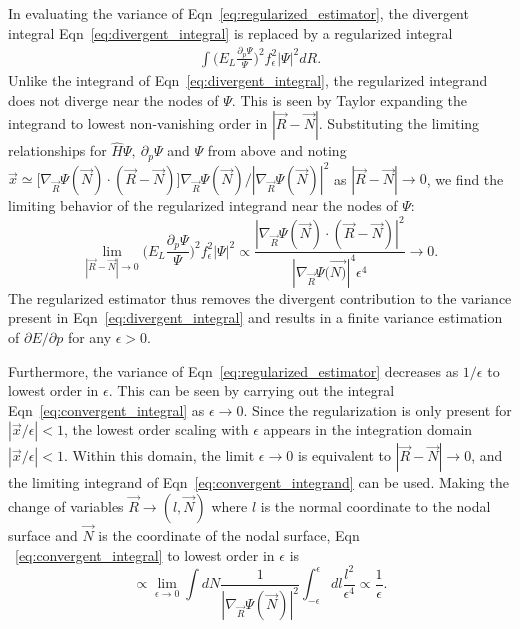 \documentclass[twocolumn]{revtex4-1}
\begin{document}
In evaluating the variance of Eqn~\ref{eq:regularized_estimator}, the divergent integral Eqn~\ref{eq:divergent_integral} is replaced by a regularized integral
\begin{equation}
\begin{split}
\int \Big(E_L\frac{\partial_p\Psi}{\Psi}\Big)^2 f_\epsilon^2 |\Psi|^2 dR.
\end{split}
\label{eq:convergent_integral}
\end{equation}
Unlike the integrand of Eqn~\ref{eq:divergent_integral}, the regularized integrand does not diverge near the nodes of $\Psi$. 
This is seen by Taylor expanding the integrand to lowest non-vanishing order in $|\vec{R} - \vec{N}|$. 
Substituting the limiting relationships for $\hat{H}\Psi, \ \partial_p \Psi$ and $\Psi$ from above and noting $\vec{x} \simeq \Big[\nabla_{\vec{R}}\Psi(\vec{N}) \cdot (\vec{R} - \vec{N}) \Big]\nabla_{\vec{R}} \Psi(\vec{N}) / |\nabla_{\vec{R}} \Psi(\vec{N})|^2$ as $|\vec{R} - \vec{N}| \rightarrow 0$, we find the limiting behavior of the regularized integrand near the nodes of $\Psi$: 
\begin{equation}
\lim_{|\vec{R} - \vec{N}| \rightarrow 0 } \Big(E_L\frac{\partial_p\Psi}{\Psi}\Big)^2 f_\epsilon^2 |\Psi|^2 \propto \frac{|\nabla_{\vec{R}}\Psi(\vec{N}) \cdot (\vec{R} - \vec{N})|^2}{|\nabla_{\vec{R}}\Psi(\vec{N)}|^4 \epsilon^4}\rightarrow 0.
\label{eq:convergent_integrand}
\end{equation}
The regularized estimator thus removes the divergent contribution to the variance present in Eqn~\ref{eq:divergent_integral} and results in a finite variance estimation of $\partial E/\partial p$ for any $\epsilon > 0$.

Furthermore, the variance of Eqn~\ref{eq:regularized_estimator} decreases as $1/\epsilon$ to lowest order in $\epsilon$.
This can be seen by carrying out the integral Eqn~\ref{eq:convergent_integral} as $\epsilon\rightarrow 0 $. 
Since the regularization is only present for $|\vec{x}/\epsilon| < 1$, the lowest order scaling with $\epsilon$ appears in the integration domain $|\vec{x}/\epsilon| < 1$. 
Within this domain, the limit $\epsilon \rightarrow 0$ is equivalent to $|\vec{R} - \vec{N}| \rightarrow 0$, and the limiting integrand of Eqn~\ref{eq:convergent_integrand} can be used. 
Making the change of variables $\vec{R} \rightarrow (l, \vec{N})$ where $l$ is the normal coordinate to the nodal surface and $\vec{N}$ is the coordinate of the nodal surface, Eqn ~\ref{eq:convergent_integral} to lowest order in $\epsilon$ is 
\begin{equation}
\propto \lim_{\epsilon \rightarrow 0 } \int dN \frac{1}{|\nabla_{\vec{R}}\Psi(\vec{N})|^2} \int_{-\epsilon}^{\epsilon} dl \frac{l^2}{\epsilon^4} \propto \frac{1}{\epsilon}.
\end{equation}
\end{document}
